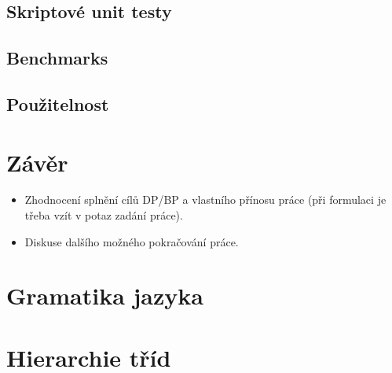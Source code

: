 \documentclass[11pt,twoside,a4paper]{book}
\begin{document}
\section{Skriptové unit testy}

\section{Benchmarks}

\section{Použitelnost}



\chapter{Závěr}

\begin{itemize}
\item Zhodnocení splnění cílů DP/BP a  vlastního přínosu práce (při formulaci je třeba vzít v potaz zadání práce).
\item Diskuse dalšího možného pokračování práce.
\end{itemize}



%
%
%



\appendix


\chapter{Gramatika jazyka}



\chapter{Hierarchie tříd}


\end{document}
